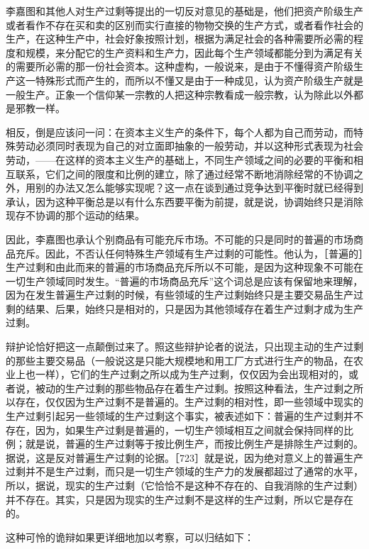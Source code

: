 李嘉图和其他人对生产过剩等提出的一切反对意见的基础是，他们把资产阶级生产或者看作不存在买和卖的区别而实行直接的物物交换的生产方式，或者看作社会的生产，在这种生产中，社会好象按照计划，根据为满足社会的各种需要所必需的程度和规模，来分配它的生产资料和生产力，因此每个生产领域都能分到为满足有关的需要所必需的那一份社会资本。这种虚构，一般说来，是由于不懂得资产阶级生产这一特殊形式而产生的，而所以不懂又是由于一种成见，认为资产阶级生产就是一般生产。正象一个信仰某一宗教的人把这种宗教看成一般宗教，认为除此以外都是邪教一样。

相反，倒是应该问一问：在资本主义生产的条件下，每个人都为自己而劳动，而特殊劳动必须同时表现为自己的对立面即抽象的一般劳动，并以这种形式表现为社会劳动，——在这样的资本主义生产的基础上，不同生产领域之间的必要的平衡和相互联系，它们之间的限度和比例的建立，除了通过经常不断地消除经常的不协调之外，用别的办法又怎么能够实现呢？这一点在谈到通过竞争达到平衡时就已经得到承认，因为这种平衡总是以有什么东西要平衡为前提，就是说，协调始终只是消除现存不协调的那个运动的结果。

因此，李嘉图也承认个别商品有可能充斥市场。不可能的只是同时的普遍的市场商品充斥。因此，不否认任何特殊生产领域有生产过剩的可能性。他认为，［普遍的］生产过剩和由此而来的普遍的市场商品充斥所以不可能，是因为这种现象不可能在一切生产领域同时发生。“普遍的市场商品充斥”这个词总是应该有保留地来理解，因为在发生普遍生产过剩的时候，有些领域的生产过剩始终只是主要交易品生产过剩的结果、后果，始终只是相对的，只是因为其他领域存在着生产过剩才成为生产过剩。

辩护论恰好把这一点颠倒过来了。照这些辩护论者的说法，只出现主动的生产过剩的那些主要交易品（一般说这是只能大规模地和用工厂方式进行生产的物品，在农业上也一样），它们的生产过剩之所以成为生产过剩，仅仅因为会出现相对的，或者说，被动的生产过剩的那些物品存在着生产过剩。按照这种看法，生产过剩之所以存在，仅仅因为生产过剩不是普遍的。生产过剩的相对性，即一些领域中现实的生产过剩引起另一些领域的生产过剩这个事实，被表述如下：普遍的生产过剩并不存在，因为，如果生产过剩是普遍的，一切生产领域相互之间就会保持同样的比例；就是说，普遍的生产过剩等于按比例生产，而按比例生产是排除生产过剩的。据说，这是反对普遍生产过剩的论据。［723］就是说，因为绝对意义上的普遍生产过剩并不是生产过剩，而只是一切生产领域的生产力的发展都超过了通常的水平，所以，据说，现实的生产过剩（它恰恰不是这种不存在的、自我消除的生产过剩）并不存在。其实，只是因为现实的生产过剩不是这样的生产过剩，所以它是存在的。

这种可怜的诡辩如果更详细地加以考察，可以归结如下：

